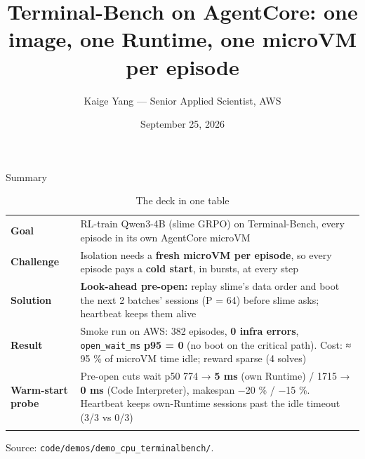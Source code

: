 \documentclass[
  10pt,
  ignorenonframetext,
  aspectratio=169,
  t]{beamer}
\title[Terminal-Bench on AgentCore]{Terminal-Bench on AgentCore: one image, one Runtime, one microVM
per episode}
\author[Kaige Yang, AWS]{Kaige Yang --- Senior Applied Scientist, AWS}
\date{September 25, 2026}
\begin{document}
\frame{\titlepage}

\begin{frame}[fragile]{Summary}
\protect\hypertarget{summary}{}
\begin{longtable}[]{@{}
  >{\raggedright\arraybackslash}p{}
  >{\raggedright\arraybackslash}p{}@{}}
\caption{The deck in one table}\tabularnewline
\toprule\noalign{}
\endfirsthead
\endhead
\textbf{Goal} & RL-train Qwen3-4B (slime GRPO) on Terminal-Bench, every
episode in its own AgentCore microVM \\
\textbf{Challenge} & Isolation needs a \textbf{fresh microVM per
episode}, so every episode pays a \textbf{cold start}, in bursts, at
every step \\
\textbf{Solution} & \textbf{Look-ahead pre-open:} replay slime's data
order and boot the next 2 batches' sessions (P = 64) before slime asks;
heartbeat keeps them alive \\
\textbf{Result} & Smoke run on AWS: 382 episodes, \textbf{0 infra
errors}, \texttt{open\_wait\_ms} \textbf{p95 = 0} (no boot on the
critical path). Cost: ≈ 95 \% of microVM time idle; reward sparse (4
solves) \\
\textbf{Warm-start probe} & Pre-open cuts wait p50 774 → \textbf{5 ms}
(own Runtime) / 1715 → \textbf{0 ms} (Code Interpreter), makespan −20 \%
/ −15 \%. Heartbeat keeps own-Runtime sessions past the idle timeout
(3/3 vs 0/3) \\
\bottomrule\noalign{}
\end{longtable}

Source: \texttt{code/demos/demo\_cpu\_terminalbench/}.
\end{frame}
\end{document}
